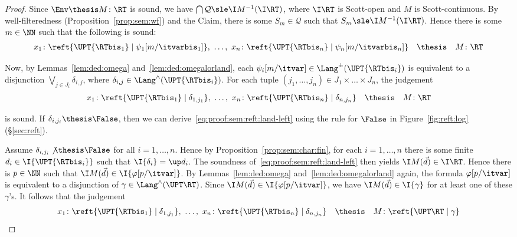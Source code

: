 \begin{proof}
Since $\Env \thesis M \colon \RT$ is sound, we have
$\bigcap \mathcal{Q} \sle \I M^{-1}(\I\RT)$,
where $\I\RT$ is Scott-open and $M$ is Scott-continuous.
By well-filteredness (Proposition~\ref{prop:sem:wf}) and the Claim,
there is some $S_m \in \mathcal{Q}$ such that
$S_m \sle \I M^{-1}(\I\RT)$.
Hence there is some $m \in \NN$ such that the following is sound:
\begin{equation}
\label{eq:proof:sem:reft:neutral-left}
\begin{array}{l l l}
  x_1 \colon \reft{\UPT{\RTbis_1} \mid \psi_1[m / \itvarbis_1]}
  ,~ \dots,~
  x_n \colon \reft{\UPT{\RTbis_n} \mid \psi_n[m / \itvarbis_n]}
& \thesis
& M \colon \RT
\end{array}
\end{equation}

Now, by Lemmas~\ref{lem:ded:omega} and~\ref{lem:ded:omegalorland},
each $\psi_i[m/\itvar] \in \Lang^\pm(\UPT{\RTbis_i})$
is equivalent to a disjunction $\bigvee_{j \in J_i} \delta_{i,j}$,
where $\delta_{i,j} \in \Lang^\land(\UPT{\RTbis_i})$.
For each tuple $(j_1,\dots,j_n) \in J_1 \times \dots \times J_n$,
the judgement
\begin{equation}
\label{eq:proof:sem:reft:land-left}
\begin{array}{l l l}
  x_1 \colon \reft{\UPT{\RTbis_1} \mid \delta_{1,j_1}}
  ,~ \dots,~
  x_n \colon \reft{\UPT{\RTbis_n} \mid \delta_{n,j_n}}
& \thesis
& M \colon \RT
\end{array}
\end{equation}

\noindent
is sound.
%
If $\delta_{i,j_i} \thesis \False$, then we can
derive~\eqref{eq:proof:sem:reft:land-left}
using the rule for $\False$ in Figure~\ref{fig:reft:log} (\S\ref{sec:reft}).

Assume $\delta_{i,j_i} \not\thesis \False$ for all $i = 1,\dots,n$.
Hence by Proposition~\ref{prop:sem:char:fin},
for each $i = 1,\dots,n$
there is some finite $d_i \in \I{\UPT{\RTbis_i}}$
such that $\I{\delta_i} = \up d_i$.
The soundness of~\eqref{eq:proof:sem:reft:land-left}
then yields
$\I M(\vec d) \in \I\RT$.
%
Hence there is $p \in \NN$ such that $\I M(\vec d) \in \I{\varphi[p / \itvar]}$.
By Lemmas~\ref{lem:ded:omega} and~\ref{lem:ded:omegalorland} again,
the formula $\varphi[p / \itvar]$ is equivalent to a disjunction
of $\gamma \in \Lang^\land(\UPT\RT)$.
Since $\I M(\vec d) \in \I{\varphi[p / \itvar]}$,
we have $\I M(\vec d) \in \I{\gamma}$ for at least one of these $\gamma$'s.
%
It follows that the judgement 
\[
\begin{array}{l l l}
  x_1 \colon \reft{\UPT{\RTbis_1} \mid \delta_{1,j_1}}
  ,~ \dots,~
  x_n \colon \reft{\UPT{\RTbis_n} \mid \delta_{n,j_n}}
& \thesis
& M \colon \reft{\UPT\RT \mid \gamma}
\end{array}
\]


\end{proof}
